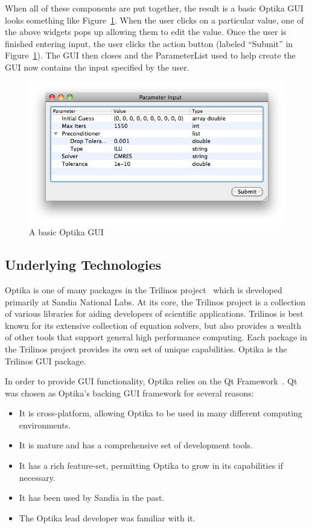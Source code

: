 When all of these components are put together, the result is a basic Optika GUI looks something like Figure~\ref{basicexample}.
When the user clicks on a particular value, one of the above widgets pops up allowing them to edit the value.
Once the user is finished entering input, the user clicks the action button (labeled ``Submit'' in Figure~\ref{basicexample}).
The GUI then closes and the ParameterList used to help create the GUI now contains the input specified by the user.

\begin{figure}
\centering
\includegraphics[scale=0.5]{graphics/basic_example}
\caption[Basic GUI]{A basic Optika GUI}
\label{basicexample}
\end{figure} 

\subsection{Underlying Technologies}
Optika is one of many packages in the Trilinos project~\cite{trilinos} which is developed primarily at Sandia National Labs. At its core, 
the Trilinos project is a collection of various
libraries for aiding developers of scientific applications. Trilinos is best known for its extensive collection of equation solvers,
but also provides a wealth of other tools that support general high performance computing. Each package in the Trilinos project provides
its own set of unique capabilities. Optika is the Trilinos GUI package.

In order to provide GUI functionality, Optika relies on the Qt Framework~\cite{Qt}. 
Qt was chosen as Optika's backing GUI framework for several reasons:
	\begin{itemize}
		\item It is cross-platform, allowing Optika to be used in many different computing environments.
		\item It is mature and has a comprehensive set of development tools. 
		\item It has a rich feature-set, permitting Optika to grow in its capabilities if necessary.
		\item It has been used by Sandia in the past.
		\item The Optika lead developer was familiar with it.
	\end{itemize}

